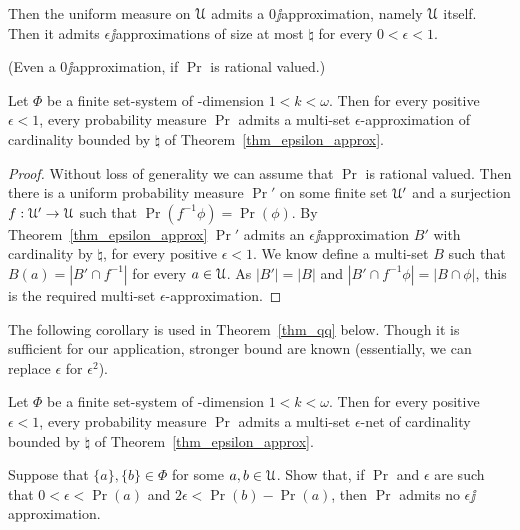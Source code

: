 \documentclass[sputnik.tex]{subfiles}
\begin{document}
Then the uniform measure on $\EuScript U$ admits a $0\jj$approximation, namely $\EuScript U$ itself.
Then it admits $\epsilon\jj$approximations of size at most $\natural$ for every $0<\epsilon<1$.

% 
(Even a $0\jj$approximation, if $\Pr$ is rational valued.)\QED

\begin{corollary}\label{coroll_epsilon_multiapprox}Let $\Phi$ be a finite set-system of \vc-dimension $1<k<\omega$.
Then for every positive $\epsilon<1$, every probability measure $\Pr$ admits a multi-set $\epsilon$-approximation of cardinality bounded by $\natural$ of Theorem~\ref{thm_epsilon_approx}.
\end{corollary}
\begin{proof}
Without loss of generality we can assume that $\Pr$ is rational valued.
Then there is a uniform probability measure $\Pr'$ on some finite set $\EuScript U'$ and a surjection $f:\EuScript U'\to\EuScript U$ such that $\Pr(f^{-1}\phi)=\Pr(\phi)$.
By Theorem~\ref{thm_epsilon_approx} $\Pr'$ admits an $\epsilon\jj$approximation $B'$ with cardinality by $\natural$, for every positive $\epsilon<1$.
We know define a multi-set $B$ such that $B(a)=|B'\cap f^{-1}|$ for every $a\in\EuScript U$.
As $|B'|=|B|$ and $|B'\cap f^{-1}\phi|=|B\cap\phi|$, this is the required multi-set $\epsilon$-approximation.
\end{proof}

The following corollary is used in Theorem~\ref{thm_qq} below.
Though it is sufficient for our application, stronger bound are known (essentially, we can replace $\epsilon$ for $\epsilon^2$).



\begin{corollary}\label{coroll_epsilon_net}
Let $\Phi$ be a finite set-system of \vc-dimension $1<k<\omega$.
Then for every positive $\epsilon<1$, every probability measure $\Pr$ admits a multi-set $\epsilon$-net of cardinality bounded by $\natural$ of Theorem~\ref{thm_epsilon_approx}.
\end{corollary}

\begin{exercise}\label{ex_counterexample}
Suppose that $\{a\},\{b\}\in\Phi$ for some $a,b\in\EuScript U$.
Show that, if $\Pr$ and $\epsilon$ are such that $0<\epsilon<\Pr(a)$ and $2\epsilon<\Pr(b)-\Pr(a)$, then $\Pr$ admits no $\epsilon\jj$approximation.\QED
\end{exercise}



 
\end{document}
